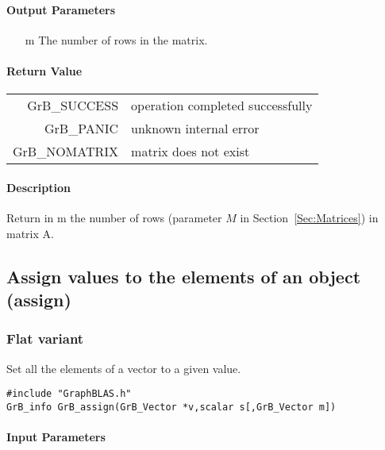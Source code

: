 \documentclass[11pt]{extarticle}
\begin{document}
\paragraph{Output Parameters}
\begin{itemize}
	\item[{\sf m}] The number of rows in the matrix.
\end{itemize}

\paragraph{Return Value}

\begin{tabular}{rl}
{\sf GrB\_SUCCESS}	& operation completed successfully \\
{\sf GrB\_PANIC}	& unknown internal error \\
{\sf GrB\_NOMATRIX}	& matrix does not exist \\
\end{tabular}

\paragraph{Description}

Return in {\sf m} the number of rows (parameter $M$ in Section~\ref{Sec:Matrices}) in matrix {\sf A}.

\subsection{Assign values to the elements of an object ({\sf assign})}


\subsubsection{Flat variant}

Set all the elements of a vector to a given value.

\begin{verbatim}
#include "GraphBLAS.h"
GrB_info GrB_assign(GrB_Vector *v,scalar s[,GrB_Vector m])
\end{verbatim}

\paragraph{Input Parameters}
\end{document}
